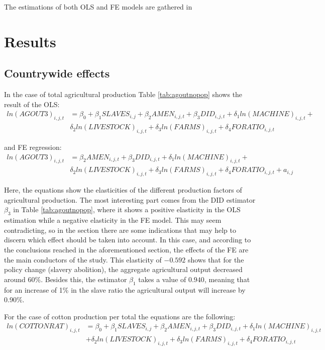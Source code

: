 \documentclass[12pt]{report}
\begin{document}
The estimations of both OLS and FE models are gathered in 
\chapter{Results}
\section{Countrywide effects}
In the case of total agricultural production Table \ref{tab:agoutnopop} shows the result of the OLS: \begin{equation}\begin{split}
ln(AGOUT3)_{i,j,t} &=\beta_{0}+\beta_{1}SLAVES_{i,j}+\beta_{2}AMEN_{i,j,t}+\beta_{3}DID_{i,j,t}+\delta_{1}ln(MACHINE)_{i,j,t}+
\\
&\delta_{2}ln(LIVESTOCK)_{i,j,t}+\delta_{3}ln(FARMS)_{i,j,t}+\delta_{4}FORATIO_{i,j,t}
\end{split}
\end{equation}


and FE regression:\begin{equation}
\begin{split}
ln(AGOUT3)_{i,j,t} &=\beta_{2}AMEN_{i,j,t}+\beta_{3}DID_{i,j,t}+\delta_{1}ln(MACHINE)_{i,j,t}+
\\
&\delta_{2}ln(LIVESTOCK)_{i,j,t}+\delta_{3}ln(FARMS)_{i,j,t}+\delta_{4}FORATIO_{i,j,t} + a_{i,j}
\end{split}
\end{equation}


Here, the equations show the elasticities of the different production factors of agricultural production. The most interesting part comes from the DID estimator $\beta_{3}$ in Table \ref{tab:agoutnopop}, where it shows a positive elasticity in the OLS estimation while a negative elasticity in the FE model. This may seem contradicting, so in the  section there are some indications that may help to discern which effect should be taken into account. In this case, and according to the conclusions reached in the aforementioned section, the effects of the FE are the main conductors of the study. This elasticity of $-0.592$ shows that for the policy change (slavery abolition), the aggregate agricultural output decreased around 60\%. Besides this, the estimator $\beta_{1}$ takes a value of $0.940$, meaning that for an increase of 1\% in the slave ratio the agricultural output will increase by 0.90\%.

For the case of cotton production per total the equations are the following:
\begin{equation}\begin{split}
ln(COTTONRAT)_{i,j,t} &=\beta_{0}+\beta_{1}SLAVES_{i,j}+\beta_{2}AMEN_{i,j,t}+\beta_{3}DID_{i,j,t}+\delta_{1}ln(MACHINE)_{i,j,t}
\\
&+\delta_{2}ln(LIVESTOCK)_{i,j,t}+\delta_{3}ln(FARMS)_{i,j,t}+\delta_{4}FORATIO_{i,j,t}
\end{split}
\end{equation}
\end{document}
